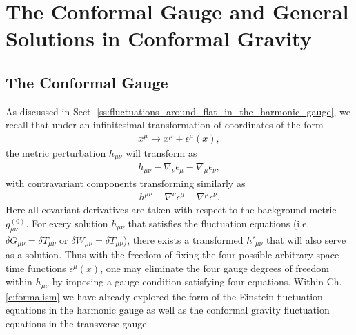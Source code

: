 \section{The Conformal Gauge and General Solutions in Conformal Gravity}
\label{s:conformal_gauge_sols}

\subsection{The Conformal Gauge}
\label{ss:conformal_gauge}
As discussed in Sect. \ref{ss:fluctuations_around_flat_in_the_harmonic_gauge}, we recall that under an infinitesimal transformation of coordinates of the form
%
\begin{eqnarray}
x^{\mu}\rightarrow x^{\mu}+\epsilon^{\mu}(x),
\label{liecoord}
\end{eqnarray}
%
the metric perturbation $h_{\mu\nu}$ will transform as
%
\begin{eqnarray}
h_{\mu\nu}-\nabla_{\nu}\epsilon_{\mu}-\nabla_{\mu}\epsilon_{\nu},
\label{covarh}
\end{eqnarray}
%
with contravariant components transforming similarly as
%
\begin{eqnarray}
h^{\mu\nu}-\nabla^{\nu}\epsilon^{\mu}-\nabla^{\mu}\epsilon^{\nu}.
\label{contrah}
\end{eqnarray}
%
Here all covariant derivatives are taken with respect to the background metric $g_{\mu\nu}^{(0)}$. For every solution $h_{\mu\nu}$ that satisfies the fluctuation equations (i.e. $\delta G_{\mu\nu} = \delta T_{\mu\nu}$ or $\delta W_{\mu\nu} = \delta T_{\mu\nu}$), there exists a transformed $h'_{\mu\nu}$ that will also serve as a solution. Thus with the freedom of fixing the four possible arbitrary space-time functions $\epsilon^\mu(x)$, one may eliminate the four gauge degrees of freedom within $h_{\mu\nu}$ by imposing a gauge condition satisfying four equations. Within Ch. \ref{c:formalism} we have already explored the form of the Einstein fluctuation equations in the harmonic gauge as well as the conformal gravity fluctuation equations in the transverse gauge.

